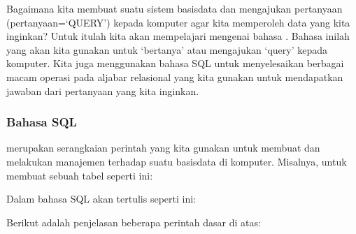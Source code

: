 \documentclass[letterpaper,10pt,english]{sphinxmanual}
\begin{document}
Bagaimana kita membuat suatu sistem basisdata dan mengajukan pertanyaan (pertanyaan=‘QUERY’) kepada komputer agar kita memperoleh data yang kita inginkan? Untuk itulah kita akan mempelajari mengenai bahasa . Bahasa inilah yang akan kita gunakan untuk ‘bertanya’ atau mengajukan ‘query’ kepada komputer. Kita juga menggunakan bahasa SQL untuk menyelesaikan berbagai macam operasi pada aljabar relasional yang kita gunakan untuk mendapatkan jawaban dari pertanyaan yang kita inginkan.


\subsubsection{Bahasa SQL}
\label{\detokenize{sesi2/relationaldb:bahasa-sql}}
 merupakan serangkaian perintah yang kita gunakan untuk membuat dan melakukan manajemen terhadap suatu basisdata di komputer. Misalnya, untuk membuat sebuah tabel seperti ini:


Dalam bahasa SQL akan tertulis seperti ini:

\begin{sphinxVerbatim}[commandchars=\\\{\}]
   
	   
	 
	 
      
      
      
  
\end{sphinxVerbatim}

Berikut adalah penjelasan beberapa perintah dasar di atas:
\end{document}
